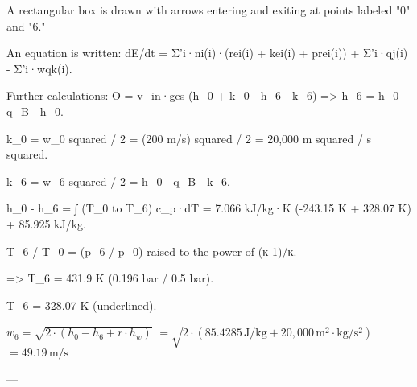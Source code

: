 A rectangular box is drawn with arrows entering and exiting at points labeled "0" and "6."  

An equation is written:  
dE/dt = Σ'i·ni(i)·(rei(i) + kei(i) + prei(i)) + Σ'i·qj(i) - Σ'i·wqk(i).  

Further calculations:  
O = v_in·ges (h_0 + k_0 - h_6 - k_6) => h_6 = h_0 - q_B - h_0.  

k_0 = w_0 squared / 2 = (200 m/s) squared / 2 = 20,000 m squared / s squared.  

k_6 = w_6 squared / 2 = h_0 - q_B - k_6.  

h_0 - h_6 = ∫ (T_0 to T_6) c_p·dT = 7.066 kJ/kg·K (-243.15 K + 328.07 K) + 85.925 kJ/kg.  

T_6 / T_0 = (p_6 / p_0) raised to the power of (κ-1)/κ.  

=> T_6 = 431.9 K (0.196 bar / 0.5 bar).  

T_6 = 328.07 K (underlined).

\( w_6 = \sqrt{2 \cdot (h_0 - h_6 + r \cdot h_w)} \)  
\( = \sqrt{2 \cdot (85.4285 \, \text{J/kg} + 20,000 \, \text{m}^2 \cdot \text{kg}/\text{s}^2)} \)  
\( = 49.19 \, \text{m/s} \)  

---